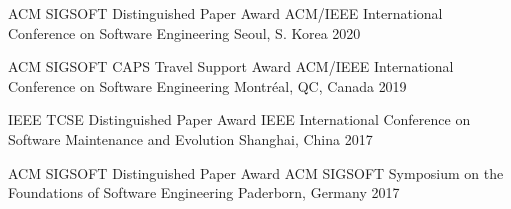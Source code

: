  

\begin{cvhonors}

  \cvhonor
    {ACM SIGSOFT Distinguished Paper Award} %
    {ACM/IEEE International Conference on Software Engineering} %
    {Seoul, S. Korea} %
    {2020} %

  \cvhonor
    {ACM SIGSOFT CAPS Travel Support Award} %
    {ACM/IEEE International Conference on Software Engineering} %
    {Montréal, QC, Canada} %
    {2019} %

  \cvhonor
    {IEEE TCSE Distinguished Paper Award} %
    {IEEE International Conference on Software Maintenance and Evolution} %
    {Shanghai, China} %
    {2017} %

  \cvhonor
    {ACM SIGSOFT Distinguished Paper Award} %
    {ACM SIGSOFT Symposium on the Foundations of Software Engineering} %
    {Paderborn, Germany} %
    {2017} %

\end{cvhonors}
